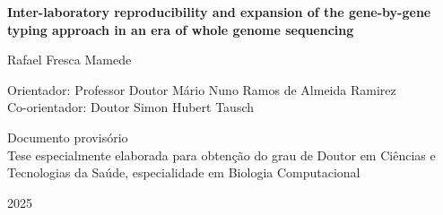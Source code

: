 \begin{titlepage}
\begin{center}
        \vspace{1cm}

        \huge
        \textbf{Inter-laboratory reproducibility and expansion of the gene-by-gene typing approach in an era of whole genome sequencing}
        \normalsize
        
        \vspace{1cm}
        
        \large
        Rafael Fresca Mamede
        \normalsize
        
        \vspace{1cm}
        
        Orientador: Professor Doutor Mário Nuno Ramos de Almeida Ramirez\\
        Co-orientador: Doutor Simon Hubert Tausch
        
        \vfill

        Documento provisório \\
        Tese especialmente elaborada para obtenção do grau de Doutor em Ciências e Tecnologias da Saúde, especialidade em Biologia Computacional\\
        
        \vspace{0.8cm}
        
        2025
        
    \end{center}
\end{titlepage}
